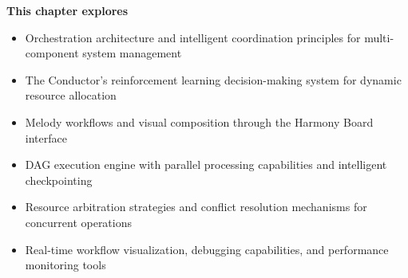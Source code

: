 
\begin{tcolorbox}[
    enhanced,
    colback=white,
    colframe=brandPrimary!40,
    boxrule=1pt,
    arc=12pt,
    drop shadow={brandPrimary!20},
    left=1.5cm,
    right=1.5cm,
    top=1.2cm,
    bottom=1.2cm,
    before upper={\parindent0pt}
]
\begin{center}
{\Large\textbf{\textcolor{brandPrimary}{This chapter explores}}}
\end{center}

\vspace{0.8cm}

\begin{itemize}[leftmargin=1.2cm, itemsep=0.4cm, label={\textcolor{brandAccent}{$\triangleright$}}]
    \item {\large Orchestration architecture and intelligent coordination principles for multi-component system management}
    \item {\large The Conductor's reinforcement learning decision-making system for dynamic resource allocation}
    \item {\large Melody workflows and visual composition through the Harmony Board interface}
    \item {\large DAG execution engine with parallel processing capabilities and intelligent checkpointing}
    \item {\large Resource arbitration strategies and conflict resolution mechanisms for concurrent operations}
    \item {\large Real-time workflow visualization, debugging capabilities, and performance monitoring tools}
\end{itemize}
\end{tcolorbox}

\clearpage
